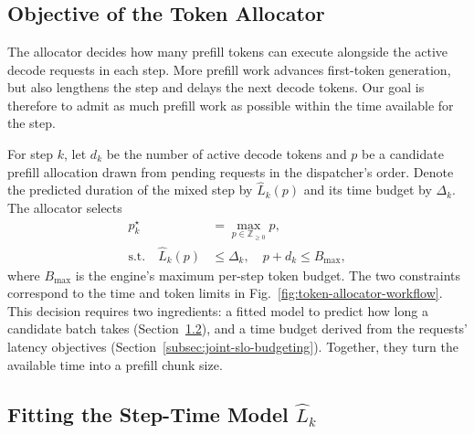 \section{\allocator{}}
\label{sec:step-time-model-guided-token-allocator}

\subsection{Objective of the Token Allocator}
\label{subsec:token-allocation-objective}

The allocator decides how many prefill tokens can execute alongside the active decode requests in each step.
More prefill work advances first-token generation, but also lengthens the step and delays the next decode tokens.
Our goal is therefore to admit as much prefill work as possible within the time available for the step.

For step $k$, let $d_k$ be the number of active decode tokens and $p$ be a candidate prefill allocation drawn from pending requests in the dispatcher's order.
Denote the predicted duration of the mixed step by $\widehat{L}_k(p)$ and its time budget by $\Delta_k$.
The allocator selects
\begin{equation}
  \begin{aligned}
    p_k^\star &= \max_{p\in\mathbb{Z}_{\geq0}} p, \\
    \text{s.t.}\quad \widehat{L}_k(p) &\leq \Delta_k,
      \quad p+d_k \leq B_{\max},
  \end{aligned}
  \label{eq:model-guided-prefill-budget}
\end{equation}
where $B_{\max}$ is the engine's maximum per-step token budget.
The two constraints correspond to the time and token limits in Fig.~\ref{fig:token-allocator-workflow}.
This decision requires two ingredients: a fitted model to predict how long a candidate batch takes (Section~\ref{subsec:step-time-modeling}), and a time budget derived from the requests' latency objectives (Section~\ref{subsec:joint-slo-budgeting}).
Together, they turn the available time into a prefill chunk size.


\subsection{Fitting the Step-Time Model $\widehat{L}_k$}
\label{subsec:step-time-modeling}

